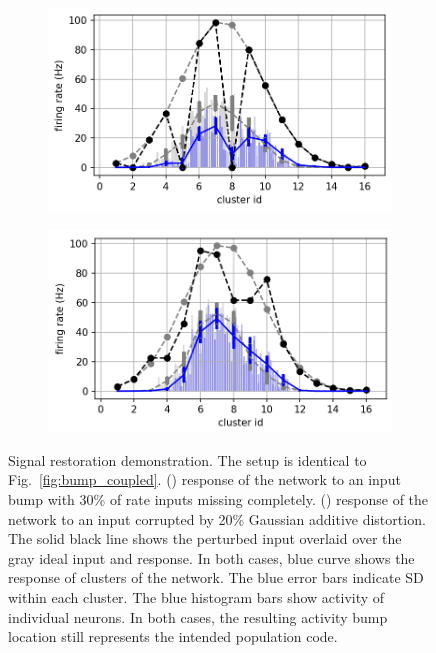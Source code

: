 \begin{figure}[h]
\centering
\begin{subfigure}{.48\textwidth}
\includegraphics[width=\linewidth]{img/chapter4/example_distorted_bump.png}
\caption{}
\label{fig:resoration}
\end{subfigure}
\hfill
\begin{subfigure}{.49\textwidth}
\includegraphics[width=\linewidth]{img/chapter4/sWTA_normal_noise_example2.png}
\caption{}
\label{fig:bump_noise}
\end{subfigure}
\caption[Population code Signal restoration]{Signal restoration demonstration. The setup is identical to Fig.~\ref{fig:bump_coupled}. () response of the network to an input bump  with 30\% of rate inputs missing completely. () response of the network to an input corrupted by 20\% Gaussian additive distortion. The solid black line shows the perturbed input overlaid over the gray ideal input and response. In both cases, blue curve shows the response of clusters of the network. The blue error bars indicate SD within each cluster. The blue histogram bars show activity of individual neurons. In both cases, the resulting activity bump location still represents the intended population code.}
\label{fig:pop_code_robustness}
\end{figure}

